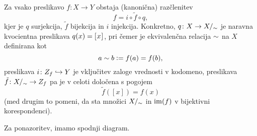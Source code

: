                 \begin{izrek}
                        Za vsako preslikavo $f\colon X \to Y$ obstaja (kanonična) razčlenitev
                        \[f = i \circ \tilde{f} \circ q,\]
                        kjer je $q$ surjekcija, $\tilde{f}$ bijekcija in $i$ injekcija. Konkretno, $q\colon X \to X/_\sim$ je naravna kvocientna preslikava $q(x) = [\:\!{x}\:\!]_{}$, pri čemer je ekvivalenčna relacija $\sim$ na $X$ definirana kot
                        \[a \sim b \mathrel{\mathop:}= f(a) = f(b),\]
                        preslikava $i\colon Z_{f} \hookrightarrow Y$ je vključitev zaloge vrednosti v kodomeno, preslikava $\tilde{f}\colon X/_\sim \to Z_{f}$ pa je v celoti določena s pogojem
                        \[\tilde{f}([x]) = f(x)\]
                        (med drugim to pomeni, da sta množici $X/_\sim$ in $\mathrm{im}(f)$ v bijektivni korespondenci). 

                        Za ponazoritev, imamo spodnji diagram.

                \end{izrek}

                \begin{dokaz}
                \end{dokaz}

